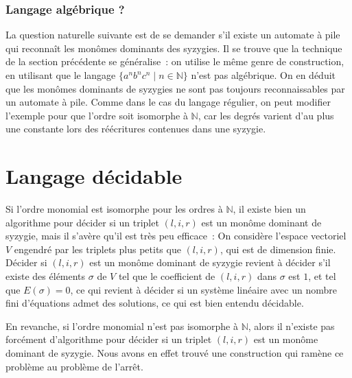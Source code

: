 \documentclass{article}
\newcommand{\N}{\mathbb{N}}
\begin{document}
\subsubsection*{Langage algébrique ?}

La question naturelle suivante est de se demander s'il existe un automate à pile qui reconnaît les monômes dominants des syzygies.
Il se trouve que la technique de la section précédente se généralise~: on utilise le même genre de construction, en utilisant que le langage $\{a^nb^nc^n \;|\; n \in \N\}$ n'est pas algébrique.
On en déduit que les monômes dominants de syzygies ne sont pas toujours reconnaissables par un automate à pile. Comme dans le cas du langage régulier, on peut modifier l'exemple pour que l'ordre soit isomorphe à $\N$, car les degrés varient d'au plus une constante lors des réécritures contenues dans une syzygie.

\section*{Langage décidable}

Si l'ordre monomial est isomorphe pour les ordres à $\N$, il existe bien un algorithme pour décider si un triplet $(l, i, r)$ est un monôme dominant de syzygie, mais il s'avère qu'il est très peu efficace~:
On considère l'espace vectoriel $V$ engendré par les triplets plus petits que $(l, i, r)$, qui est de dimension finie.
Décider si $(l, i, r)$ est un monôme dominant de syzygie revient à décider s'il existe des éléments $\sigma$ de $V$ tel que le coefficient de $(l, i, r)$ dans $\sigma$ est $1$, et tel que $E(\sigma) = 0$, ce qui revient à décider si un système linéaire avec un nombre fini d'équations admet des solutions, ce qui est bien entendu décidable.

En revanche, si l'ordre monomial n'est pas isomorphe à $\N$, alors il n'existe pas forcément d'algorithme pour décider si un triplet $(l, i, r)$ est un monôme dominant de syzygie. Nous avons en effet trouvé une construction qui ramène ce problème au problème de l'arrêt.

\nocite{*}
\printbibliography
\end{document}
